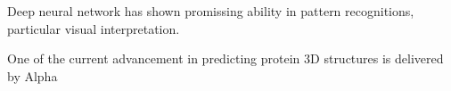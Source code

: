 Deep neural network has shown promissing ability in pattern recognitions, particular visual interpretation.
\par 

One of the current advancement in predicting protein 3D structures is delivered by Alpha